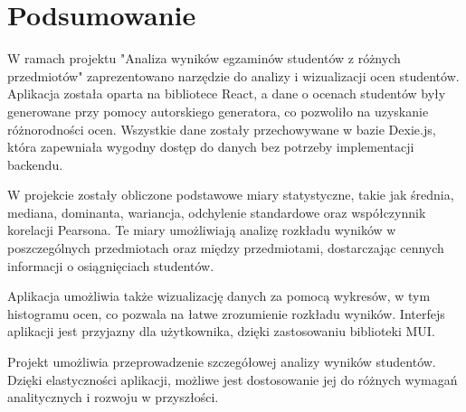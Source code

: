 \section{Podsumowanie}
W ramach projektu "Analiza wyników egzaminów studentów z różnych przedmiotów" zaprezentowano narzędzie do analizy i wizualizacji ocen studentów. Aplikacja została oparta na bibliotece React, a dane o ocenach studentów były generowane przy pomocy autorskiego generatora, co pozwoliło na uzyskanie różnorodności ocen. Wszystkie dane zostały przechowywane w bazie Dexie.js, która zapewniała wygodny dostęp do danych bez potrzeby implementacji backendu.

W projekcie zostały obliczone podstawowe miary statystyczne, takie jak średnia, mediana, dominanta, wariancja, odchylenie standardowe oraz współczynnik korelacji Pearsona. Te miary umożliwiają analizę rozkładu wyników w poszczególnych przedmiotach oraz między przedmiotami, dostarczając cennych informacji o osiągnięciach studentów.

Aplikacja umożliwia także wizualizację danych za pomocą wykresów, w tym histogramu ocen, co pozwala na łatwe zrozumienie rozkładu wyników. Interfejs aplikacji jest przyjazny dla użytkownika, dzięki zastosowaniu biblioteki MUI.

Projekt umożliwia przeprowadzenie szczegółowej analizy wyników studentów. Dzięki elastyczności aplikacji, możliwe jest dostosowanie jej do różnych wymagań analitycznych i rozwoju w przyszłości.
